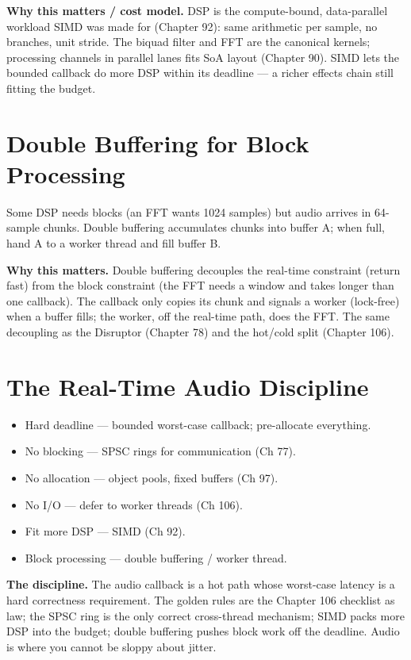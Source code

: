 \textbf{Why this matters / cost model.} DSP is the compute-bound, data-parallel workload SIMD was made for (Chapter 92): same arithmetic per sample, no branches, unit stride. The biquad filter and FFT are the canonical kernels; processing channels in parallel lanes fits SoA layout (Chapter 90). SIMD lets the bounded callback do more DSP within its deadline --- a richer effects chain still fitting the budget.

\section{Double Buffering for Block Processing}
Some DSP needs blocks (an FFT wants 1024 samples) but audio arrives in 64-sample chunks. Double buffering accumulates chunks into buffer A; when full, hand A to a worker thread and fill buffer B.

\textbf{Why this matters.} Double buffering decouples the real-time constraint (return fast) from the block constraint (the FFT needs a window and takes longer than one callback). The callback only copies its chunk and signals a worker (lock-free) when a buffer fills; the worker, off the real-time path, does the FFT. The same decoupling as the Disruptor (Chapter 78) and the hot/cold split (Chapter 106).

\section{The Real-Time Audio Discipline}
\begin{itemize}
\item Hard deadline --- bounded worst-case callback; pre-allocate everything.
\item No blocking --- SPSC rings for communication (Ch 77).
\item No allocation --- object pools, fixed buffers (Ch 97).
\item No I/O --- defer to worker threads (Ch 106).
\item Fit more DSP --- SIMD (Ch 92).
\item Block processing --- double buffering / worker thread.
\end{itemize}

\textbf{The discipline.} The audio callback is a hot path whose worst-case latency is a hard correctness requirement. The golden rules are the Chapter 106 checklist as law; the SPSC ring is the only correct cross-thread mechanism; SIMD packs more DSP into the budget; double buffering pushes block work off the deadline. Audio is where you cannot be sloppy about jitter.
